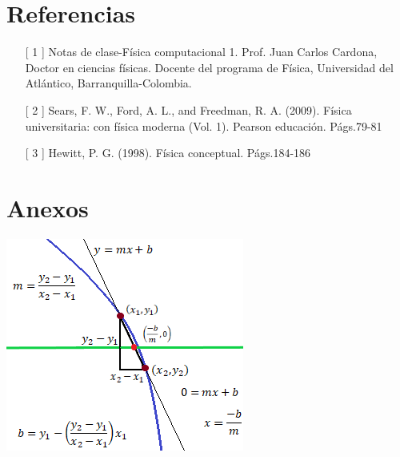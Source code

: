 \documentclass[11pt,letterpaper,twocolumn]{article}
\begin{document}
\section*{Referencias} 
\begin{itemize}
\item[[ 1]] Notas de clase-Física computacional 1. Prof. Juan Carlos Cardona, Doctor en ciencias físicas. Docente del programa de Física, Universidad del Atlántico, Barranquilla-Colombia. 

\item[[ 2]] Sears, F. W., Ford, A. L., and Freedman, R. A. (2009).
Física universitaria: con física moderna (Vol. 1). Pearson educación.
Págs.79-81

\item[[ 3]] Hewitt, P. G. (1998). Física conceptual. Págs.184-186
\end{itemize}

\section*{\normalsize{Anexos}}
\begin{center}
\includegraphics[scale=1]{piso.png}
\end{center}
\end{document}
